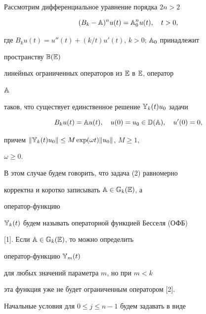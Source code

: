  




\maketitle 


\label{begin} 


 


Рассмотрим дифференциальное уравнение порядка $2n>2$ 


\begin{equation} 


(B_k-\Bbb A)^n u(t)=\Bbb A^n_0u(t),\quad t>0, 


\end{equation} 


где $B_k u(t)=u''(t)+(k/t)u'(t)$, $k>0$; $\Bbb A_0$ принадлежит 


пространству $\Bbb B(\Bbb E)$ 


линейных ограниченных операторов из $\Bbb E$ в $\Bbb E$, оператор 


$\Bbb A$ 


таков, что существует единственное решение $\Bbb Y_k(t)u_0$ задачи 


\begin{equation} 


B_k u(t)=\Bbb A u(t),\quad u(0)=u_0\in\Bbb D(\Bbb A),\quad 


u'(0)=0, 


\end{equation} 


причем $\|\Bbb Y_k(t)u_0\|\le M\exp(\omega t)\|u_0\|$, $M\ge 1$, 


$\omega\ge 0$. 


В этом случае будем говорить, что задача (2) равномерно  


корректна и коротко записывать $\Bbb A\in\Bbb G_k(\Bbb E)$, а 


оператор-функцию 


$\Bbb Y_k(t)$ будем называть операторной функцией Бесселя (ОФБ) 


[1]. Если $\Bbb A\in\Bbb G_k(\Bbb E)$, то можно определить 


оператор-функцию $\Bbb Y_m(t)$ 


для любых значений параметра $m$, но при $m<k$ 


эта функция уже не будет ограниченным оператором [2]. 


Начальные условия для $0\le j\le n-1$ будем задавать в виде 


